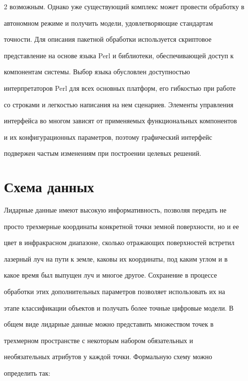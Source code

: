 \begin{multicols}{2}
возможным. Однако уже существующий комплекс может провести обработку в 

автономном режиме и получить модели, удовле\-тво\-ря\-ющие стандартам 

точности. Для описания пакетной обработки используется скриптовое 

представление на основе языка Perl и библиотеки, обес\-пе\-чи\-ва\-ющей доступ к 

компонентам системы. Выбор языка обусловлен доступностью 

интерпретаторов Perl для всех основных платформ, его гибкостью при работе 

со строками и легкостью написания на нем сценариев. Элементы управления 

интерфейса во многом зависят от применяемых функциональных компонентов 

и их конфигурационных параметров, поэтому графический интерфейс 

подвержен частым изменениям при построении целевых решений.



  \section{Схема данных}

   

   Лидарные данные имеют высокую информативность, позволяя передать не 

просто трехмерные координаты конкретной точки земной поверхности, но и ее 

цвет в инфракрасном диапазоне, сколько отражающих поверхностей встретил 

лазерный луч на пути к земле, каковы их координаты, под каким углом и в 

какое время был выпущен луч и многое другое. Сохранение в процессе 

обработки этих дополнительных параметров позволяет использовать их на 

этапе классификации объектов и получать более точные цифровые модели. В 

общем виде лидарные данные можно представить множеством точек в 

трехмерном пространстве с некоторым набором обязательных и 

необязательных атрибутов у каждой точки. Формальную схему можно 

определить так:

   

   \end{multicols}

